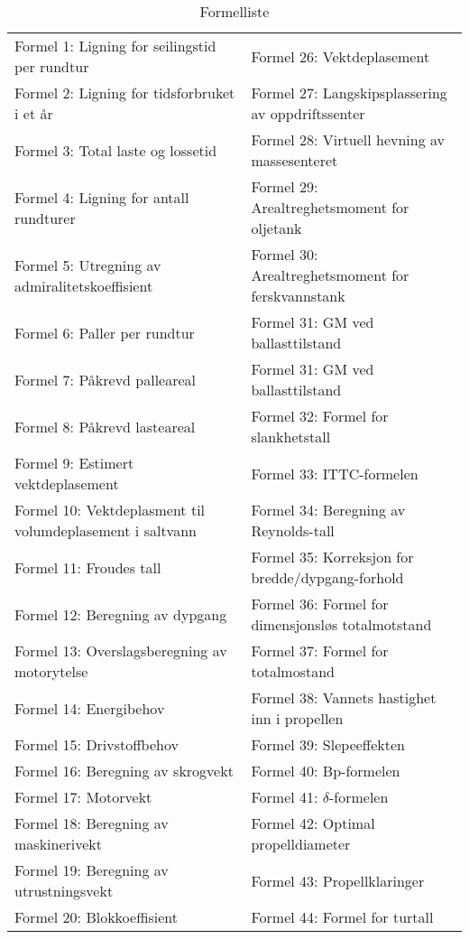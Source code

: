 \documentclass[norsk]{article}
\begin{document}
\begin{table}[htbp]
    \caption{Formelliste}
    \label{tab:table2}
    \hskip-3.0cm\begin{tabular}{l|l} 
      \hline
      Formel 1: Ligning for seilingstid per rundtur &  Formel 26:  			  Vektdeplasement\\
      Formel 2: Ligning for tidsforbruket i et år & Formel 27: Langskipsplassering av oppdriftssenter\\ 
      Formel 3: Total laste og lossetid & Formel 28: Virtuell hevning av massesenteret\\
      Formel 4: Ligning for antall rundturer & Formel 29: Arealtreghetsmoment for oljetank\\
      Formel 5: Utregning av admiralitetskoeffisient &  Formel 30: Arealtreghetsmoment for ferskvannstank\\ 
      Formel 6: Paller per rundtur & Formel 31: GM ved ballasttilstand\\
      Formel 7: Påkrevd palleareal &  Formel 31: GM ved ballasttilstand\\ 
      Formel 8: Påkrevd lasteareal & Formel 32: Formel for slankhetstall\\
      Formel 9: Estimert vektdeplasement & Formel 33: ITTC-formelen\\ 
      Formel 10: Vektdeplasment til volumdeplasement i saltvann & Formel 34: Beregning av Reynolds-tall\\
      Formel 11: Froudes tall & Formel 35: Korreksjon for bredde/dypgang-forhold\\
      Formel 12: Beregning av dypgang & Formel 36: Formel for dimensjonsløs totalmotstand\\
      Formel 13: Overslagsberegning av motorytelse & Formel 37: Formel for totalmostand\\
      Formel 14: Energibehov & Formel 38: Vannets hastighet inn i propellen\\
      Formel 15: Drivstoffbehov & Formel 39: Slepeeffekten\\
      Formel 16: Beregning av skrogvekt & Formel 40: Bp-formelen\\
      Formel 17: Motorvekt & Formel 41: $\delta$-formelen \\
      Formel 18: Beregning av maskinerivekt & Formel 42: Optimal propelldiameter\\
      Formel 19: Beregning av utrustningsvekt & Formel 43: Propellklaringer\\
      Formel 20: Blokkoeffisient & Formel 44: Formel for turtall\\

\end{tabular}
\end{table}
\end{document}
